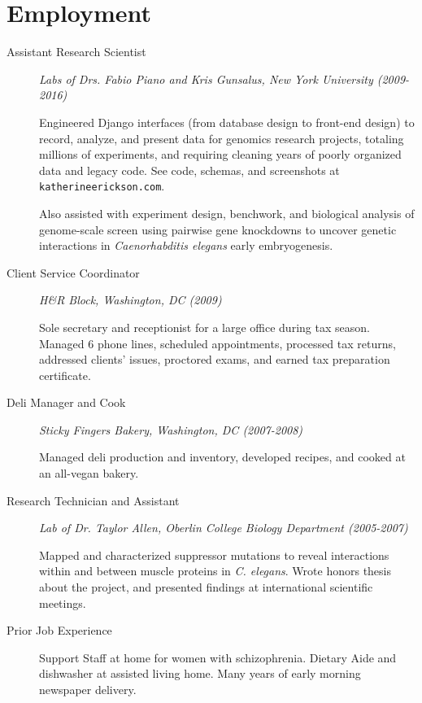 \documentclass{article}
\newcommand{\website}{\texttt{katherineerickson.com}}
\begin{document}
  \section*{Employment}
  \begin{description}
    \item[Assistant Research Scientist]
    \emph{Labs of Drs. Fabio Piano and Kris Gunsalus, New York University
    (2009-2016)}

    Engineered Django interfaces (from database design to front-end
    design) to record, analyze, and present data for genomics research projects,
    totaling millions of experiments, and requiring cleaning years of
    poorly organized data and legacy code.
    See code, schemas, and screenshots at \website.

    Also assisted with experiment design, benchwork, and biological analysis of
    genome-scale screen using pairwise gene knockdowns to uncover
    genetic interactions in \emph{Caenorhabditis elegans} early embryogenesis.

    \item[Client Service Coordinator]
    \emph{H\&R Block, Washington, DC (2009)}

    Sole secretary and receptionist for a large office during tax season.
    Managed 6 phone lines, scheduled appointments, processed tax returns,
    addressed clients' issues, proctored exams, and earned tax preparation
    certificate.

    \item[Deli Manager and Cook]
    \emph{Sticky Fingers Bakery, Washington, DC (2007-2008)}

    Managed deli production and inventory, developed recipes,
    and cooked at an all-vegan bakery.

    \item[Research Technician and Assistant]
    \emph{Lab of Dr. Taylor Allen, Oberlin College Biology Department
        (2005-2007)}

    Mapped and characterized suppressor mutations to reveal interactions
    within and between muscle proteins in \emph{C. elegans}.
    Wrote honors thesis about the project,
    and presented findings at international scientific meetings.

    \item[Prior Job Experience]
    Support Staff at home for women with schizophrenia.
    Dietary Aide and dishwasher at assisted living home.
    Many years of early morning newspaper delivery.
  \end{description}
\end{document}
